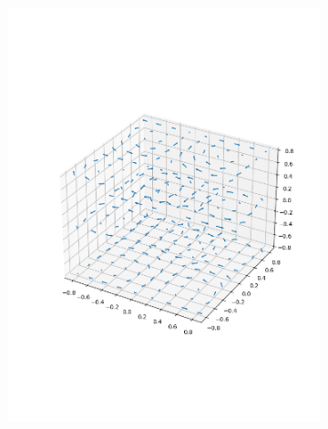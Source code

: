 \begin{figure}
\begin{subfigure}{0.32\linewidth}
		\includegraphics[width=\linewidth]{figures/wind2.png}
		\caption{}
		\label{fig:wind1}
	\end{subfigure}
	\begin{subfigure}{0.32\linewidth}

\end{subfigure}
\end{figure}
